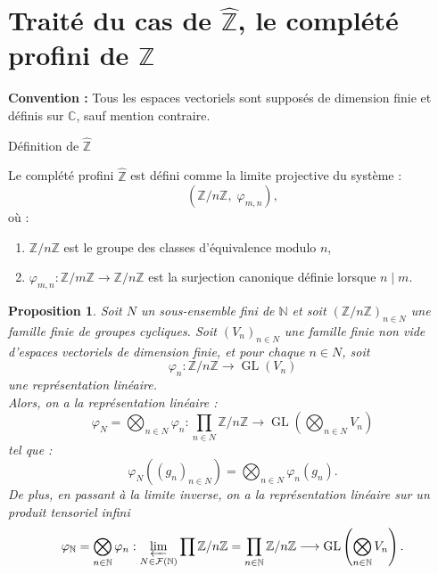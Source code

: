 \documentclass[9pt]{beamer}
\newtheorem{proposition}{Proposition}
\begin{document}
\section{Traité du cas de $\widehat{\mathbb{Z}}$, le complété profini de $\mathbb{Z}$}

\begin{frame}
	\textbf{Convention :} Tous les espaces vectoriels sont supposés de dimension finie et définis sur \( \mathbb{C} \), sauf mention contraire.
\end{frame}

\begin{frame}{Définition de \texorpdfstring{$\widehat{\mathbb{Z}}$}{Z-chapeau}}
	\begin{definition}
Le complété profini \( \widehat{\mathbb{Z}} \) est défini comme la limite projective du système :
		\[
		\left(\mathbb{Z}/n\mathbb{Z},\; \varphi_{m,n}\right),
		\]
		où :
		\begin{enumerate}[label=\roman*)]
			\item \( \mathbb{Z}/n\mathbb{Z} \) est le groupe des classes d’équivalence modulo \( n \),
			\item \( \varphi_{m,n} : \mathbb{Z}/m\mathbb{Z} \to \mathbb{Z}/n\mathbb{Z} \) est la surjection canonique définie lorsque \( n \mid m \).
		\end{enumerate}
	\end{definition}
\end{frame}

\begin{frame}
	\begin{proposition}
	Soit \( N \) un sous-ensemble fini de \( \mathbb{N} \) et soit \( (\mathbb{Z}/n\mathbb{Z})_{n \in N} \) une famille finie de groupes cycliques. Soit \( (V_n)_{n \in N} \) une famille finie non vide d'espaces vectoriels de dimension finie, et pour chaque \( n \in N \), soit 
	\[
	\varphi_n: \mathbb{Z}/n\mathbb{Z} \to \operatorname{GL}(V_n)
	\]
	une représentation linéaire.\\  
	Alors, on a la représentation linéaire :
	\[
	\varphi_N = \bigotimes_{n\in N} \varphi_n: \prod_{n \in N} \mathbb{Z}/n\mathbb{Z} \to \operatorname{GL} \left( \bigotimes_{n \in N} V_n \right)
	\]
	tel que :
	\[
	\varphi_N((g_n)_{n \in N}) = \bigotimes_{n \in N} \varphi_n(g_n).
	\]
	De plus, en passant à la limite inverse, on a la représentation linéaire sur un produit tensoriel infini
	\[
	\varphi_\mathbb{N} = \bigotimes_{n\in \mathbb{N}} \varphi_n: 	\varprojlim_{N \in \mathcal{F}(\mathbb{N})} \prod \mathbb{Z}/n\mathbb{Z} = \prod_{n \in \mathbb{N}} \mathbb{Z}/n\mathbb{Z} \longrightarrow \operatorname{GL}\left( \bigotimes_{n \in \mathbb{N}} V_n \right).
	\]
\end{proposition}
\end{frame}
\end{document}
